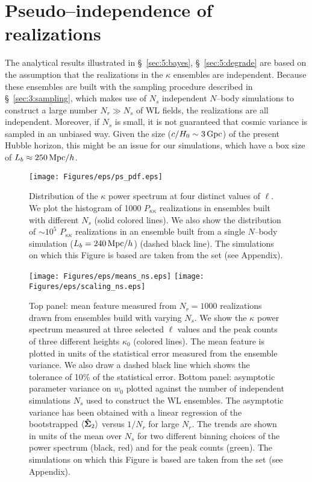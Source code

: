 \section{Pseudo--independence of realizations}
\label{sec:5:pseudo}
The analytical results illustrated in \S~\ref{sec:5:bayes}, \S~\ref{sec:5:degrade} are based on the assumption that the realizations in the $\kappa$ ensembles are independent. Because these ensembles are built with the sampling procedure described in \S~\ref{sec:3:sampling}, which makes use of $N_s$ independent $N$--body simulations to construct a large number $N_r\gg N_s$ of WL fields, the realizations are all independent. Moreover, if $N_s$ is small, it is not guaranteed that cosmic variance is sampled in an unbiased way. Given the size ($c/H_0\sim 3\,{\rm Gpc}$) of the present Hubble horizon, this might be an issue for our simulations, which have a box size of $L_b\approx 250\,{\rm Mpc}/h$. 
%
\begin{figure}
\begin{center}
\texttt{[image: Figures/eps/ps\_pdf.eps]}
\end{center}
\caption{Distribution of the $\kappa$ power spectrum at four distinct values of $\ell$. We plot the histogram of 1000 $P_{\kappa\kappa}$ realizations in ensembles built with different $N_s$ (solid colored lines). We also show the distribution of $\sim 10^5$ $P_{\kappa\kappa}$ realizations in an ensemble built from a single $N$--body simulation ($L_b=240\,{\rm Mpc}/h$) (dashed black line). The simulations on which this Figure is based are taken from the  set (see Appendix).}
\label{fig:5:pspdf}
\end{figure}
%
\begin{figure}
\begin{center}
\texttt{[image: Figures/eps/means\_ns.eps]} \texttt{[image: Figures/eps/scaling\_ns.eps]}
\end{center}
\caption{Top panel: mean feature measured from $N_r=1000$ realizations drawn from ensembles build with varying $N_s$. We show the $\kappa$ power spectrum measured at three selected $\ell$ values and the peak counts of three different heights $\kappa_0$ (colored lines). The mean feature is plotted in units of the statistical error measured from the ensemble variance. We also draw a dashed black line which shows the tolerance of 10\% of the statistical error. Bottom panel: asymptotic parameter variance on $w_0$ plotted against the number of independent simulations $N_s$ used to construct the WL ensembles. The asymptotic variance has been obtained with a linear regression of the bootstrapped $\langle\mathbf{\hat{\Sigma}}_2\rangle$ versus $1/N_r$ for large $N_r$. The trends are shown in units of the mean over $N_s$ for two different binning choices of the power spectrum (black, red) and for the peak counts (green). The simulations on which this Figure is based are taken from the  set (see Appendix).}
\label{fig:5:mcns}
\end{figure}

